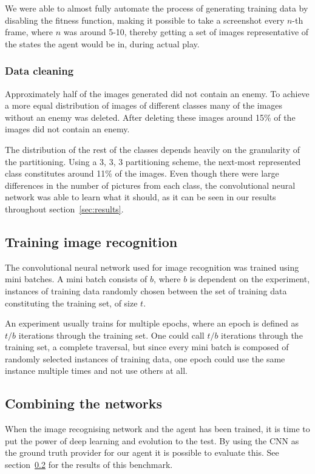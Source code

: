 We were able to almost fully automate the process of generating training data by disabling the fitness function, making it possible to take a screenshot every $n$-th frame, where $n$ was around 5-10,  thereby getting a set of images representative of the states the agent would be in, during actual play.


\subsubsection{Data cleaning}
Approximately half of the images generated did not contain an enemy. To achieve a more equal distribution of images of different classes many of the images without an enemy was deleted. After deleting these images around 15\% of the images did not contain an enemy.

The distribution of the rest of the classes depends heavily on the granularity of the partitioning. Using a 3, 3, 3 partitioning scheme, the next-most represented class constitutes around 11\% of the images. Even though there were large differences in the number of pictures from each class, the convolutional neural network was able to learn what it should, as it can be seen in our results throughout section~\ref{sec:results}.

\subsection{Training image recognition}
The convolutional neural network used for image recognition was trained using mini batches. A mini batch consists of $b$, where $b$ is dependent on the experiment, instances of training data randomly chosen between the set of training data constituting the training set, of size $t$.

An experiment usually trains for multiple epochs, where an epoch is defined as $t/b$ iterations through the training set. One could call $t/b$ iterations through the training set, a complete traversal, but since every mini batch is composed of randomly selected instances of training data, one epoch could use the same instance multiple times and not use others at all.

\subsection{Combining the networks}
When the image recognising network and the agent has been trained, it is time to put the power of deep learning and evolution to the test. By using the CNN as the ground truth provider for our agent it is possible to evaluate this. See section~\ref{} for the results of this benchmark.
